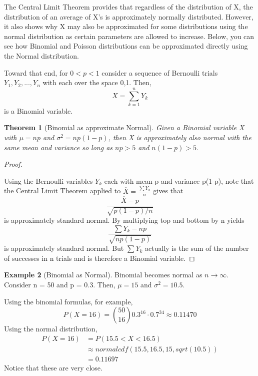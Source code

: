 \documentclass[10pt,]{book}
\theoremstyle{plain}
\newtheorem{theorem}{Theorem}[section]
\theoremstyle{definition}
\theoremstyle{definition}
\newtheorem{example}[theorem]{Example}
\theoremstyle{definition}
\numberwithin{equation}{section}
\newcommand{\lt}{ < }
\newcommand{\gt}{ > }
\begin{document}
The Central Limit Theorem provides that regardless of the distribution of X, the distribution of an average of X's is approximately normally distributed. However, it also shows why X may also be approximated for some distributions using the normal distribution as certain parameters are allowed to increase. Below, you can see how Binomial and Poisson distributions can be approximated directly using the Normal distribution.
%
\par
Toward that end, for \(0 \lt p \lt 1\) consider a sequence of Bernoulli trials \(Y_1, Y_2, ..., Y_n\) with each over the space {0,1}. Then, 
\begin{equation*}X = \sum_{k=1}^n Y_k\end{equation*}
is a Binomial variable.
%
\begin{theorem}[{Binomial as approximate Normal}]\label{theorem-65}
Given a Binomial variable X with \(\mu = np\) and \(\sigma^2 = np(1-p)\), then X is approximately also normal with the same mean and variance so long as \(np \gt 5\) and \(n(1-p) \gt 5\).
\end{theorem}
\begin{proof}\hypertarget{proof-60}{}

Using the Bernoulli variables \(Y_k\) each with mean p and variance p(1-p), note that the Central Limit Theorem applied to \(\overline{X} = \frac{\sum Y_k}{n}\) gives that
\begin{equation*}\frac{\overline{X}-p}{\sqrt{p(1-p)/n}}\end{equation*}
is approximately standard normal. By multiplying top and bottom by n yields
\begin{equation*}\frac{\sum Y_k - np}{\sqrt{np(1-p)}}\end{equation*}
is approximately standard normal. But \(\sum Y_k\) actually is the sum of the number of successes in n trials and is therefore a Binomial variable.
%
\end{proof}
\begin{example}[Binomial as Normal]\label{example-23}
Binomial becomes normal as \( n \rightarrow \infty\).  Consider n = 50 and p = 0.3.  Then, \(\mu = 15\) and \(\sigma^2 = 10.5\).   
%
\par
Using the binomial formulas, for example,
\begin{equation*}P( X = 16 ) = \binom{50}{16} 0.3^{16} \cdot 0.7^{34} \approx 0.11470\end{equation*}
Using the normal distribution,
\begin{align*}
P( X = 16 ) & = P( 15.5 \lt X \lt 16.5) \\
 & \approx normalcdf(15.5,16.5,15,sqrt(10.5)) \\
 & = 0.11697
\end{align*}
Notice that these are very close.
%
\end{example}
\end{document}
